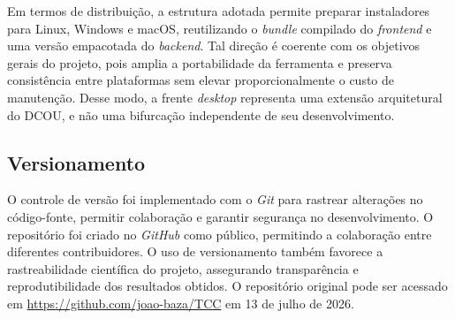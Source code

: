 Em termos de distribuição, a estrutura adotada permite preparar instaladores para Linux, Windows e macOS, reutilizando o \textit{bundle} compilado do \textit{frontend} e uma versão empacotada do \textit{backend}. Tal direção é coerente com os objetivos gerais do projeto, pois amplia a portabilidade da ferramenta e preserva consistência entre plataformas sem elevar proporcionalmente o custo de manutenção. Desse modo, a frente \textit{desktop} representa uma extensão arquitetural do DCOU, e não uma bifurcação independente de seu desenvolvimento.

\subsection{Versionamento}
O controle de versão foi implementado com o \textit{Git} para rastrear alterações no código-fonte, permitir colaboração e garantir segurança no desenvolvimento. O repositório foi criado no \textit{GitHub} como público, permitindo a colaboração entre diferentes contribuidores. O uso de versionamento também favorece a rastreabilidade científica do projeto, assegurando transparência e reprodutibilidade dos resultados obtidos. O repositório original pode ser acessado em \url{https://github.com/joao-baza/TCC} em 13 de julho de 2026.
